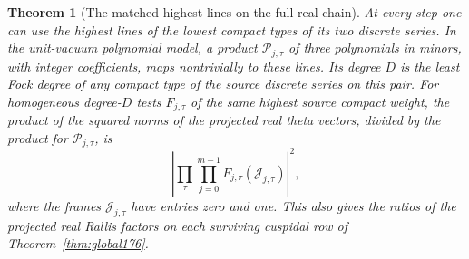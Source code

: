 \documentclass[a4paper,11pt]{article}
\newtheorem{theorem}[proposition]{Theorem}
\theoremstyle{definition}
\theoremstyle{remark}
\numberwithin{equation}{section}
\begin{document}
\begin{theorem}[The matched highest lines on the full real chain]
\label{thm:harmonic188}
At every step one can use the highest lines of the lowest
compact types of its two discrete series. In the unit-vacuum
polynomial model, a product \(\mathcal P_{j,\tau}\) of three
polynomials in minors, with integer coefficients, maps nontrivially
to these lines. Its degree \(D\) is the least Fock degree of
any compact type of the source discrete series on this pair.
For homogeneous degree-\(D\) tests \(F_{j,\tau}\) of the same
highest source compact weight, the product of the squared norms
of the projected real theta vectors, divided by the product
for \(\mathcal P_{j,\tau}\), is
\begin{equation}
          \left|\prod_{\tau}\prod_{j=0}^{m-1}
                      F_{j,\tau}(\mathcal J_{j,\tau})\right|^2 ,
                                                         \label{eq:all188}
\end{equation}
where the frames \(\mathcal J_{j,\tau}\) have entries zero and one.
This also gives the ratios of the projected real Rallis factors
on each surviving cuspidal row of Theorem~\ref{thm:global176}.
\end{theorem}
\end{document}

